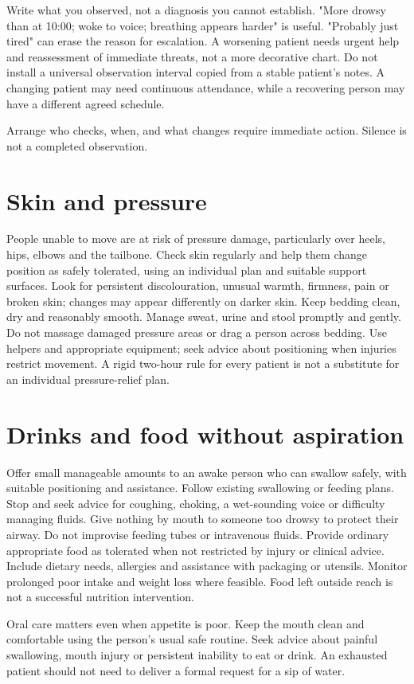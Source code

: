 \documentclass[10pt,openright]{book}
\begin{document}
Write what you observed, not a diagnosis you cannot establish. "More drowsy than at 10:00; woke to voice; breathing appears harder" is useful. "Probably just tired" can erase the reason for escalation. A worsening patient needs urgent help and reassessment of immediate threats, not a more decorative chart. Do not install a universal observation interval copied from a stable patient's notes. A changing patient may need continuous attendance, while a recovering person may have a different agreed schedule.

Arrange who checks, when, and what changes require immediate action. Silence is not a completed observation.

\section*{Skin and pressure}
People unable to move are at risk of pressure damage, particularly over heels, hips, elbows and the tailbone. Check skin regularly and help them change position as safely tolerated, using an individual plan and suitable support surfaces. Look for persistent discolouration, unusual warmth, firmness, pain or broken skin; changes may appear differently on darker skin. Keep bedding clean, dry and reasonably smooth. Manage sweat, urine and stool promptly and gently. Do not massage damaged pressure areas or drag a person across bedding. Use helpers and appropriate equipment; seek advice about positioning when injuries restrict movement. A rigid two-hour rule for every patient is not a substitute for an individual pressure-relief plan.

\section*{Drinks and food without aspiration}
Offer small manageable amounts to an awake person who can swallow safely, with suitable positioning and assistance. Follow existing swallowing or feeding plans. Stop and seek advice for coughing, choking, a wet-sounding voice or difficulty managing fluids. Give nothing by mouth to someone too drowsy to protect their airway. Do not improvise feeding tubes or intravenous fluids. Provide ordinary appropriate food as tolerated when not restricted by injury or clinical advice. Include dietary needs, allergies and assistance with packaging or utensils. Monitor prolonged poor intake and weight loss where feasible. Food left outside reach is not a successful nutrition intervention.

Oral care matters even when appetite is poor. Keep the mouth clean and comfortable using the person's usual safe routine. Seek advice about painful swallowing, mouth injury or persistent inability to eat or drink. An exhausted patient should not need to deliver a formal request for a sip of water.
\end{document}
